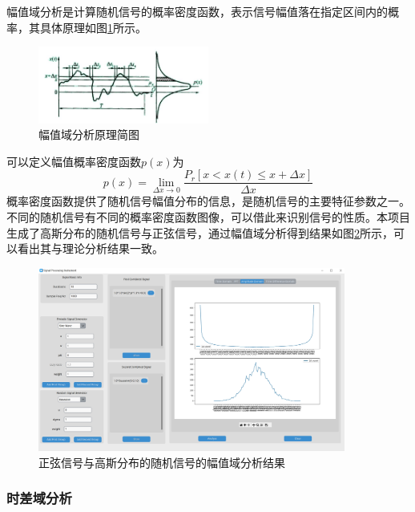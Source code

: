 \documentclass[12pt]{ctexart}
\begin{document}
幅值域分析是计算随机信号的概率密度函数，表示信号幅值落在指定区间内的概率，其具体原理如图\ref{figure4}所示。
\begin{figure}[htbp]
  \centering
  \includegraphics[width=0.5\textwidth]{img/amplitude_analysis.jpg}
  \caption{幅值域分析原理简图}\label{figure4}
\end{figure}
可以定义幅值概率密度函数$p(x)$为
\begin{equation}
  p(x)=\lim_{\Delta x\rightarrow 0}\frac{P_r\left[x<x(t)\le x+\Delta x\right]}{\Delta x}
\end{equation}
概率密度函数提供了随机信号幅值分布的信息，是随机信号的主要特征参数之一。不同的随机信号有不同的概率密度函数图像，可以借此来识别信号的性质。本项目生成了高斯分布的随机信号与正弦信号，通过幅值域分析得到结果如图\ref{figure5}所示，可以看出其与理论分析结果一致。
\begin{figure}[htbp]
  \centering
  \includegraphics[width=0.9\textwidth]{img/sin_gaussion_amplitude.png}
  \caption{正弦信号与高斯分布的随机信号的幅值域分析结果}\label{figure5}
\end{figure}

\subsubsection{时差域分析}
\end{document}
